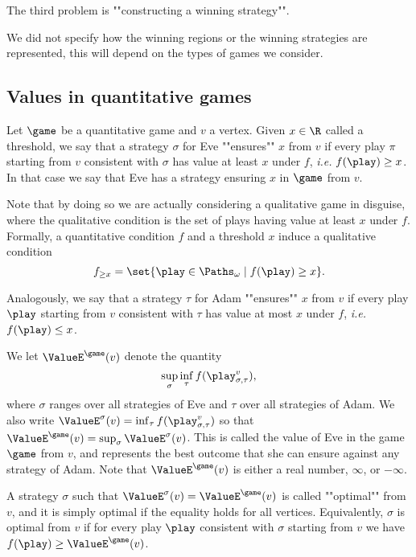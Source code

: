 The third problem is ""constructing a winning strategy"".


We did not specify how the winning regions or the winning strategies are represented, this will depend on the types of games we consider.

\subsection*{Values in quantitative games}
Let $\game$ be a quantitative game and $v$ a vertex.
Given $x \in \R$ called a threshold, we say that a strategy $\sigma$ for Eve ""ensures"" $x$ from $v$ 
if every play $\pi$ starting from $v$ consistent with $\sigma$ has value at least $x$ under $f$,
\textit{i.e.} $f(\play) \ge x$.
In that case we say that Eve has a strategy ensuring $x$ in $\game$ from $v$.

Note that by doing so we are actually considering a qualitative game in disguise, 
where the qualitative condition is the set of plays having value at least $x$ under $f$.
Formally, a quantitative condition $f$ and a threshold $x$ induce a qualitative condition 
\[
f_{\ge x} = \set{\play \in \Paths_\omega \mid f(\play) \ge x}.
\]

Analogously, we say that a strategy $\tau$ for Adam ""ensures"" $x$ from $v$ 
if every play $\play$ starting from $v$ consistent with $\tau$ has value at most $x$ under $f$,
\textit{i.e.} $f(\play) \le x$.


We let $\ValueE^{\game}(v)$ denote the quantity
\[
\sup_{\sigma} \inf_{\tau} f(\play_{\sigma,\tau}^{v}),
\]
where $\sigma$ ranges over all strategies of Eve and $\tau$ over all strategies of Adam.
We also write $\ValueE^{\sigma}(v) = \inf_{\tau} f(\play_{\sigma,\tau}^{v})$
so that $\ValueE^{\game}(v) = \sup_{\sigma} \ValueE^\sigma(v)$.
This is called the value of Eve in the game $\game$ from $v$,
and represents the best outcome that she can ensure against any strategy of Adam.
Note that $\ValueE^{\game}(v)$ is either a real number, $\infty$, or $-\infty$.

A strategy $\sigma$ such that $\ValueE^\sigma(v) = \ValueE^{\game}(v)$ is called ""optimal"" from $v$,
and it is simply optimal if the equality holds for all vertices.
Equivalently, $\sigma$ is optimal from $v$ if for every play $\play$ consistent with $\sigma$ starting from $v$ 
we have $f(\play) \ge \ValueE^{\game}(v)$.

